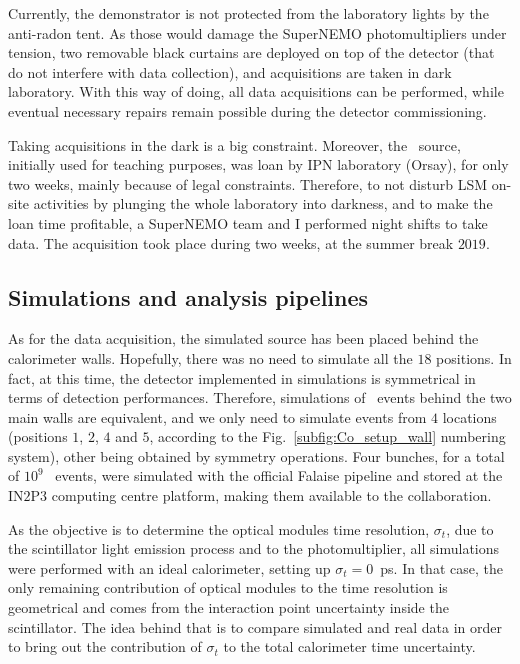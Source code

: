 Currently, the demonstrator is not protected from the laboratory lights by the anti-radon tent.
As those would damage the SuperNEMO photomultipliers under tension, two removable black curtains are deployed on top of the detector (that do not interfere with data collection), and acquisitions are taken in dark laboratory.
With this way of doing, all data acquisitions can be performed, while eventual necessary repairs remain possible during the detector commissioning.

Taking acquisitions in the dark is a big constraint.
Moreover, the \Co\ source, initially used for teaching purposes, was loan by IPN laboratory (Orsay), for only two weeks, mainly because of legal constraints.
Therefore, to not disturb LSM on-site activities by plunging the whole laboratory into darkness, and to make the loan time profitable, a SuperNEMO team and I performed night shifts to take data.
The acquisition took place during two weeks, at the summer break $2019$.

\subsection{Simulations and analysis pipelines}


As for the data acquisition, the simulated source has been placed behind the calorimeter walls.
Hopefully, there was no need to simulate all the $18$ positions.
In fact, at this time, the detector implemented in simulations is symmetrical in terms of detection performances.
Therefore, simulations of \Co\ events behind the two main walls are equivalent, and we only need to simulate events from $4$ locations (positions $1$, $2$, $4$ and $5$, according to the Fig.~\ref{subfig:Co_setup_wall} numbering system), other being obtained by symmetry operations.
Four bunches, for a total of $10^{9}$ \Co\ events, were simulated with the official Falaise pipeline and stored at the IN$2$P$3$ computing centre platform, making them available to the collaboration.

As the objective is to determine the optical modules time resolution, $\sigma_{t}$, due to the scintillator light emission process and to the photomultiplier, all simulations were performed with an ideal calorimeter, setting up ${\sigma_{t}=0}$~ps.
In that case, the only remaining contribution of optical modules to the time resolution is geometrical and comes from the interaction point uncertainty inside the scintillator.
The idea behind that is to compare simulated and real data in order to bring out the contribution of $\sigma_{t}$ to the total calorimeter time uncertainty.

